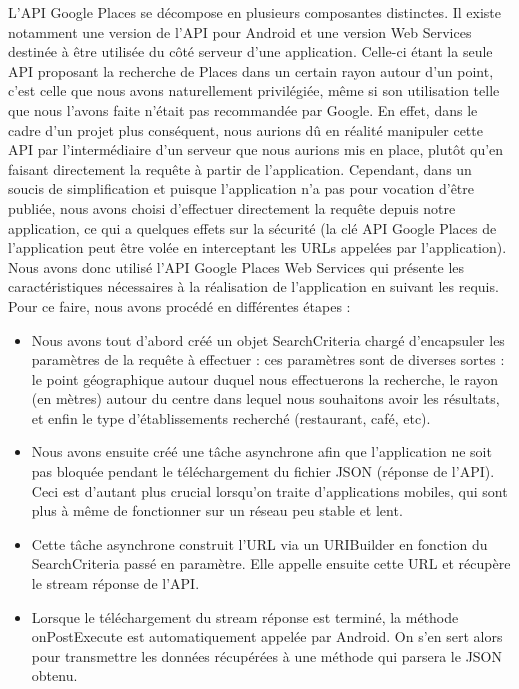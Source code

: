 L'API Google Places se décompose en plusieurs composantes distinctes. Il existe notamment une version de l'API pour Android et une version Web Services destinée à être utilisée du côté serveur d'une application. Celle-ci étant la seule API proposant la recherche de Places dans un certain rayon autour d'un point, c'est celle que nous avons naturellement privilégiée, même si son utilisation telle que nous l'avons faite n'était pas recommandée par Google. En effet, dans le cadre d'un projet plus conséquent, nous aurions dû en réalité manipuler cette API par l'intermédiaire d'un serveur que nous aurions mis en place, plutôt qu'en faisant directement la requête à partir de l'application. Cependant, dans un soucis de simplification et puisque l'application n'a pas pour vocation d'être publiée, nous avons choisi d'effectuer directement la requête depuis notre application, ce qui a quelques effets sur la sécurité (la clé API Google Places de l'application peut être volée en interceptant les URLs appelées par l'application).\\
Nous avons donc utilisé l'API Google Places Web Services qui présente les caractéristiques nécessaires à la réalisation de l'application en suivant les requis. Pour ce faire, nous avons procédé en différentes étapes :
\begin{itemize}
\item Nous avons tout d'abord créé un objet SearchCriteria chargé d'encapsuler les paramètres de la requête à effectuer : ces paramètres sont de diverses sortes : le point géographique autour duquel nous effectuerons la recherche, le rayon (en mètres) autour du centre dans lequel nous souhaitons avoir les résultats, et enfin le type d'établissements recherché (restaurant, café, etc).
\item Nous avons ensuite créé une tâche asynchrone afin que l'application ne soit pas bloquée pendant le téléchargement du fichier JSON (réponse de l'API). Ceci est d'autant plus crucial lorsqu'on traite d'applications mobiles, qui sont plus à même de fonctionner sur un réseau peu stable et lent.
\item Cette tâche asynchrone construit l'URL via un URIBuilder en fonction du SearchCriteria passé en paramètre. Elle appelle ensuite cette URL et récupère le stream réponse de l'API.
\item Lorsque le téléchargement du stream réponse est terminé, la méthode onPostExecute est automatiquement appelée par Android. On s'en sert alors pour transmettre les données récupérées à une méthode qui parsera le JSON obtenu.
\end{itemize} 

